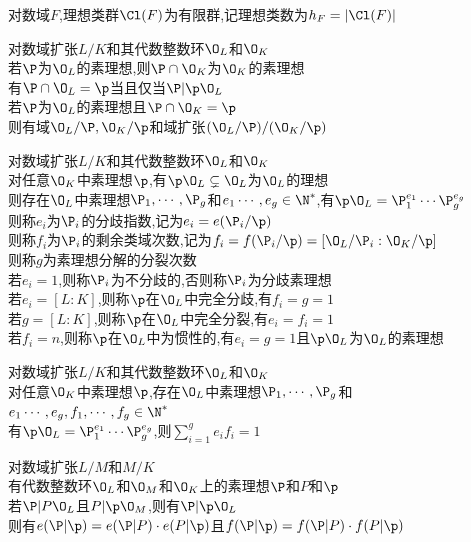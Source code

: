 \begin{dingli}
对数域$F$,理想类群$\Cl(F)$为有限群,记理想类数为$h_{F}=|\Cl(F)|$
\end{dingli}

\clearpage

\begin{dingli}
对数域扩张$L/K$和其代数整数环$\O_{L}$和$\O_{K}$\\
若$\P$为$\O_{L}$的素理想,则$\P\cap\O_{K}$为$\O_{K}$的素理想\\
有$\P\cap\O_{L}=\p$当且仅当$\P|\p\O_{L}$\\
若$\P$为$\O_{L}$的素理想且$\P\cap\O_{K}=\p$\\
则有域$\O_{L}/\P,\O_{K}/\p$和域扩张$(\O_{L}/\P)/(\O_{K}/\p)$
\end{dingli}

\begin{dingyi}
对数域扩张$L/K$和其代数整数环$\O_{L}$和$\O_{K}$\\
对任意$\O_{K}$中素理想$\p$,有$\p\O_{L}\subsetneq\O_{L}$为$\O_{L}$的理想\\
则存在$\O_{L}$中素理想$\P_1,\cdots,\P_g$和$e_1\cdots,e_g\in \N^*$,有$\p\O_{L}=\P_1^{e_1}\cdots\P_g^{e_g}$\\
则称$e_i$为$\P_i$的分歧指数,记为$e_i=e(\P_i/\p)$\\
则称$f_i$为$\P_i$的剩余类域次数,记为$f_i=f(\P_i/\p)=[\O_{L}/\P_i:\O_{K}/\p]$\\
则称$g$为素理想分解的分裂次数\\
若$e_i=1$,则称$\P_i$为不分歧的,否则称$\P_i$为分歧素理想\\
若$e_i=[L:K]$,则称$\p$在$\O_{L}$中完全分歧,有$f_i=g=1$\\
若$g=[L:K]$,则称$\p$在$\O_{L}$中完全分裂,有$e_i=f_i=1$\\
若$f_i=n$,则称$\p$在$\O_{L}$中为惯性的,有$e_i=g=1$且$\p\O_{L}$为$\O_{L}$的素理想
\end{dingyi}

\begin{dingli}
对数域扩张$L/K$和其代数整数环$\O_{L}$和$\O_{K}$\\
对任意$\O_{K}$中素理想$\p$,存在$\O_{L}$中素理想$\P_1,\cdots,\P_g$和$e_1\cdots,e_g,f_1,\cdots,f_g\in \N^*$\\
有$\p\O_{L}=\P_1^{e_1}\cdots\P_g^{e_g}$,则$\sum\limits_{i=1}^{g}e_if_i=1$
\end{dingli}

\begin{dingli}
对数域扩张$L/M$和$M/K$\\
有代数整数环$\O_{L}$和$\O_{M}$和$\O_{K}$上的素理想$\P$和$P$和$\p$\\
若$\P|P\O_{L}$且$P|\p\O_{M}$,则有$\P|\p\O_{L}$\\
则有$e(\P|\p)=e(\P|P)\cdot e(P|\p)$且$f(\P|\p)=f(\P|P)\cdot f(P|\p)$
\end{dingli}

